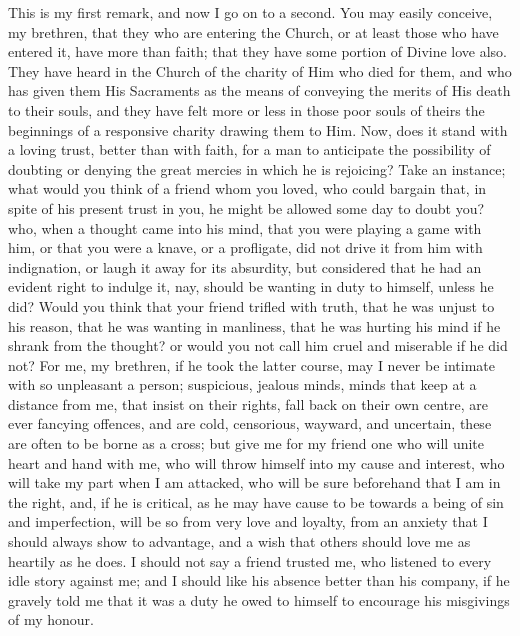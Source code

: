 This is my first remark, and now I go on to a second. You may
easily conceive, my brethren, that they who are entering the Church,
or at least those who have entered it, have more than faith; that they
have some portion of Divine love also. They have heard in the Church
of the charity of Him who died for them, and who has given them His
Sacraments as the means of conveying the merits of His death to their
souls, and they have felt more or less in those poor souls of theirs
the beginnings of a responsive charity drawing them to Him. Now, does
it stand with a loving trust, better than with faith, for a man to
anticipate the possibility of doubting or denying the great mercies in
which he is rejoicing? Take an instance; what would you think of a
friend whom you loved, who could bargain that, in spite of his present
trust in you, he might be allowed some day to doubt you? who, when a
thought came into his mind, that you were playing a game with him, or
that you were a knave, or a profligate, did not drive it from him with
indignation, or laugh it away for its absurdity, but considered that
he had an evident right to indulge it, nay, should be wanting in duty
to himself, unless he did? Would you think that your friend trifled
with truth, that he was unjust to his reason, that he was wanting in
manliness, that he was hurting his mind if he shrank from the thought?
or would you not call him cruel and miserable if he did not? For me,
my brethren, if he took the latter course, may I never be intimate
with so unpleasant a person; suspicious, jealous minds, minds that
keep at a distance from me, that insist on their rights, fall back on
their own centre, are ever fancying offences, and are cold,
censorious, wayward, and uncertain, these are often to be borne as a
cross; but give me for my friend one who will unite heart and hand
with me, who will throw himself into my cause and interest, who will
take my part when I am attacked, who will be sure beforehand that I am
in the right, and, if he is critical, as he may have cause to be
towards a being of sin and imperfection, will be so from very love and
loyalty, from an anxiety that I should always show to advantage, and a
wish that others should love me as heartily as he does. I should not
say a friend trusted me, who listened to every idle story against me;
and I should like his absence better than his company, if he gravely
told me that it was a duty he owed to himself to encourage his
misgivings of my honour.


